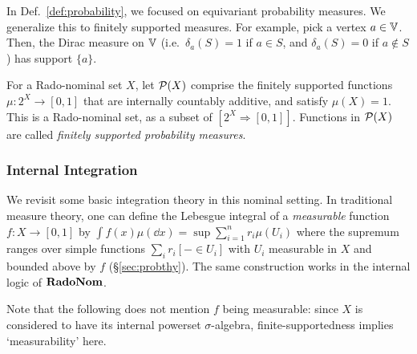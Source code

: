 In Def.~\ref{def:probability}, we focused on equivariant
probability measures.
We generalize this to finitely supported measures. For example, pick a
vertex $a\in \mathbb{V}$. Then, the Dirac measure on $\mathbb{V}$ (i.e.~$\delta_a(S)=1$ if $a\in S$,
and $\delta_a(S)=0$ if $a\not\in S$) has support $\{a\}$.

\begin{definition}
\label{def:finitely-supported-probability-measure}
For a Rado-nominal set $X$, let $\mathcal{P} (X)$ comprise the
    finitely supported functions $\mu : 2^X\to[0,1]$ that are
    internally countably additive, and satisfy $\mu(X) = 1$.
    This is a Rado-nominal set, as a subset of
    $[2^X\Rightarrow[0,1]]$. Functions in $\mathcal{P} (X)$
    are called \emph{finitely supported probability measures}.
\end{definition}

\subsubsection{Internal Integration}
We revisit some basic integration theory in this nominal setting.
In traditional measure theory, one can define the Lebesgue integral of a \emph{measurable} function ${f : X \to [0,1]}$ by
$
  \int f(x) \mu(\dd x) = \sup \sum_{i = 1}^n r_i \mu(U_i)
$
where the supremum ranges over simple functions ${\sum_i r_i [- \in U_i]}$ with $U_i$ measurable in $X$ and bounded above by $f$ (\S\ref{sec:probthy}).
The same construction works in the internal logic of $\mathbf{RadoNom}$.

Note that the following does not mention $f$ being measurable: since $X$ is considered to have its internal powerset $\sigma$-algebra, finite-supportedness %
implies `measurability' here.

